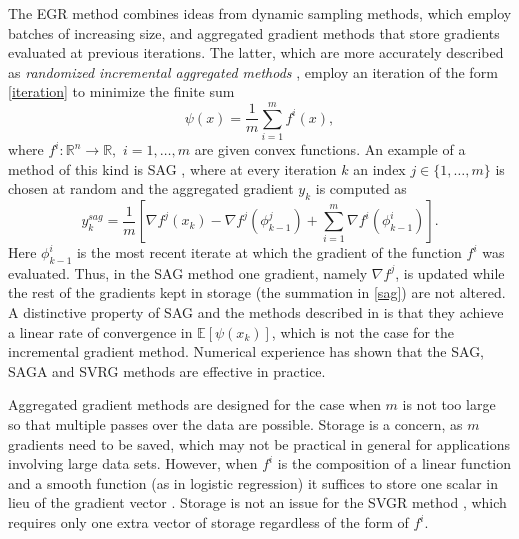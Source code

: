 \documentclass[11pt]{article}
\begin{document}
The EGR method combines ideas from dynamic sampling methods, which  employ batches of increasing size, and  aggregated gradient methods that store gradients evaluated at previous iterations. The latter, which are more accurately described as \emph{randomized incremental aggregated methods}  \cite{roux2012stochastic,johnson2013accelerating,frostig2014competing,NIPS2014_5258}, employ an iteration of the form \eqref{iteration} to minimize the finite sum 
\begin{equation}
	\label{saa}
	\psi(x)= \frac{1}{m} \sum_{i =1}^m f^i(x),
\end{equation}
where $f^i: \mathbb{R}^n \rightarrow \mathbb{R},$ $i=1, \ldots, m$ are given convex functions. 
An example of a method of this kind is SAG \cite{roux2012stochastic}, where at every iteration $k$ an index $j \in \{1, \ldots, m\}$  is chosen at random and the aggregated gradient $y_k$ is computed as
\begin{equation}   \label{sag} 
     y_k^{sag}= \frac{1}{m} \left[ \nabla f^j(x_k) -  \nabla f^j(\phi_{k-1}^j) + \sum_{i=1}^{m}  \nabla f^i (\phi^i_{k-1}) \right].
     \end{equation}
Here $\phi^i_{k-1}$ is the most recent iterate at which the gradient of the function $f^i$ was evaluated. Thus, in the SAG method one gradient, namely  $\nabla f^j$,  is updated while the rest of the gradients kept in storage (the summation in \eqref{sag}) are not altered. A distinctive property of SAG  and the methods described in  \cite{johnson2013accelerating,NIPS2014_5258,shalev2013stochastic,mairal2015incremental,defazio2014finito} 
is that they achieve a linear rate of convergence in  $\mathbb{E}[\psi(x_k)]$, which is not the case for the incremental gradient method. Numerical experience has shown that the SAG, SAGA \cite{NIPS2014_5258} and SVRG \cite{johnson2013accelerating} methods are effective in practice.

Aggregated gradient methods are designed for the case when $m$ is not too large so that multiple passes over the data are possible. Storage is a concern, as $m$ gradients need to be saved, which may not be practical in general for applications involving large data sets. However,  when $f^i$ is the composition of a linear function and a smooth function (as in logistic regression) it suffices to store one scalar in lieu of the gradient vector \cite{roux2012stochastic}. Storage is not an issue for the SVGR method \cite{johnson2013accelerating}, which requires only one extra vector of storage regardless of the form of $f^i$.
\end{document}
